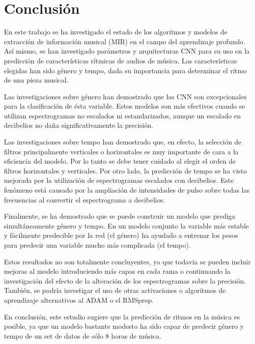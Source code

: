 \section{Conclusión}\label{sec:conclusion}

\noindent En este trabajo se ha investigado el estado de los algoritmos y modelos de extracción de información musical (MIR) en el campo del aprendizaje profundo. Así mismo, se han investigado parámetros y arquitecturas CNN para su uso en la predicción de características rítmicas de audios de música. Las características elegidas han sido género y tempo, dada su importancia para determinar el ritmo de una pieza musical.

Las investigaciones sobre género han demostrado que las CNN son excepcionales para la clasificación de ésta variable. Estos modelos son más efectivos cuando se utilizan espectrogramas no escalados ni estandarizados, aunque un escalado en decibelios no daña significativamente la precisión.

Las investigaciones sobre tempo han demostrado que, en efecto, la selección de filtros principalmente verticales o horizontales es muy importante de cara a la eficiencia del modelo. Por lo tanto se debe tener cuidado al elegir el orden de filtros horizontales y verticales. Por otro lado, la predicción de tempo se ha visto mejorada por la utilización de espectrogramas escalados con decibelios. Este fenómeno está causado por la ampliación de intensidades de pulso sobre todas las frecuencias al convertir el espectrograma a decibelios.

Finalmente, se ha demostrado que se puede construir un modelo que prediga simultáneamente género y tempo. En un modelo conjunto la variable más estable y fácilmente predecible por la red (el género) ha ayudado a entrenar los pesos para predecir una variable mucho más complicada (el tempo).

Estos resultados no son totalmente concluyentes, ya que todavía se pueden incluir mejoras al modelo introduciendo más capas en cada rama o continuando la investigación del efecto de la alteración de los espectrogramas sobre la precisión. También, se podría investigar el uso de otras activaciones o algoritmos de aprendizaje alternativos al ADAM o el RMSprop.

En conclusión, este estudio sugiere que la predicción de ritmos en la música es posible, ya que un modelo bastante modesto ha sido capaz de predecir género y tempo de un set de datos de sólo 8 horas de música.